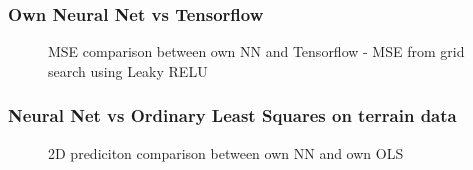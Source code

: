 \documentclass
[twocolumn,
secnumarabic,
nobibnotes,
aps,
prl,
reprint,
groupedaddress,
amsmath,
amssymb
]{revtex4-2}
\begin{document}
\subsubsection{Own Neural Net vs Tensorflow}
\begin{figure}[htb]
  \hspace*{-1.5cm}
  \caption{MSE comparison between own NN and Tensorflow - MSE from grid search using Leaky RELU\label{fig:own_NN_vs_tf}}
\end{figure}


\subsubsection{Neural Net vs Ordinary Least Squares on terrain data}

\begin{figure}[htb]
  \caption{2D prediciton comparison between own NN and own OLS \label{fig:2D_preds_NN_vs_OLS}}
\end{figure}
\end{document}
